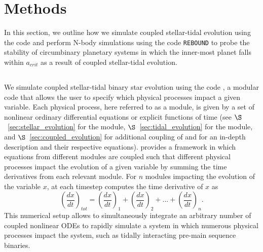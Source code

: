 

\section{Methods} \label{sec:methods}

In this section, we outline how we simulate coupled stellar-tidal evolution using the code \vplanet \citep[][Barnes \textit{et al.}, \textit{in prep}]{Barnes2016} and perform N-body simulations using the code \texttt{REBOUND} \citep{Rein2012} to probe the stability of circumbinary planetary systems in which the inner-most planet falls within $a_{crit}$ as a result of coupled stellar-tidal evolution.


\subsection{\vplanet} \label{sec:vplanet}

We simulate coupled stellar-tidal binary star evolution using the code \vplanet, a modular code that allows the user to specify which physical processes impact a given variable.  Each physical process, here referred to as a module, is given by a set of nonlinear ordinary differential equations or explicit functions of time (see $\S$~\ref{sec:stellar_evolution} for the \stellar module, $\S$~\ref{sec:tidal_evolution} for the \eqtide module, and $\S$~\ref{sec:coupled_evolution} for additional coupling of \stellar and \eqtide for an in-depth description and their respective equations).  \vplanet provides a framework in which equations from different modules are coupled such that different physical processes impact the evolution of a given variable by summing the time derivatives from each relevant module.  For $n$ modules impacting the evolution of the variable $x$, at each timestep \vplanet computes the time derivative of $x$ as
\begin{equation} \label{eqn:vplanet_dxdt}
\left( \frac{dx}{dt} \right)_{tot} = \left( \frac{dx}{dt} \right)_{1} + \left( \frac{dx}{dt} \right)_{2} + ... + \left( \frac{dx}{dt} \right)_{n}.
\end{equation}
This numerical setup allows \vplanet to simultaneously integrate an arbitrary number of coupled nonlinear ODEs to rapidly simulate a system in which numerous physical processes impact the system, such as tidally interacting pre-main sequence binaries.

